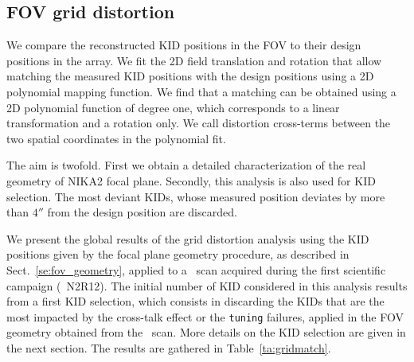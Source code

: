 \subsection{FOV grid distortion}
\label{se:grid_distortion}

We compare the reconstructed KID positions in the FOV to their design
positions in the array. We fit the 2D field translation and rotation that allow
matching the measured KID positions with the design positions using a 2D
polynomial mapping function. {\lp We find that a matching can be
obtained using a 2D polynomial function of degree one, which corresponds to a linear
transformation and a rotation only.} We call distortion cross-terms
between the two spatial coordinates in the polynomial fit.

The aim is twofold. First we obtain a detailed
characterization of the real geometry of NIKA2 focal plane. Secondly,
{\lp this analysis is also used for KID
selection}. The most deviant KIDs, whose measured position deviates
by more than $4''$ from the design position are discarded. 

We present the global results of the grid distortion
analysis using the KID positions given
by the focal plane geometry procedure, as described in
Sect.~\ref{se:fov_geometry}, applied to a \bm\ scan acquired
during the first scientific campaign (\aka\ N2R12). 
The initial
number of KID considered in this analysis results from
a first KID selection, which consists in discarding the KIDs that are the most
impacted by the cross-talk effect or the {\tt tuning} failures,
applied in the FOV geometry obtained from the \bm\ scan. More details
on the KID selection are given in the next section. %
The results are gathered in Table~\ref{ta:gridmatch}.

